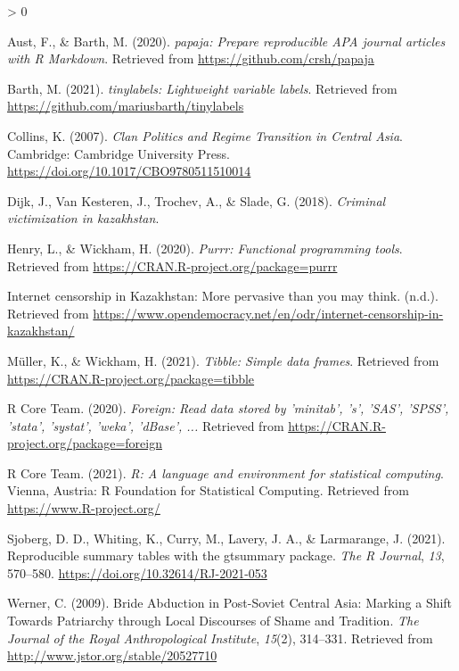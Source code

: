 \documentclass[
  english,
  man]{apa6}
\newlength{\cslhangindent}
\newenvironment{CSLReferences}[2] %
 {%
  \setlength{\parindent}{0pt}
  \ifodd #1 \everypar{\setlength{\hangindent}{\cslhangindent}}\ignorespaces\fi
  \ifnum #2 > 0
  \setlength{\parskip}{#2\baselineskip}
  \fi
 }%
 {}
\begin{document}
\hypertarget{refs}{}
\begin{CSLReferences}{1}{0}
\leavevmode\hypertarget{ref-R-papaja}{}%
Aust, F., \& Barth, M. (2020). \emph{{papaja}: {Prepare} reproducible {APA} journal articles with {R Markdown}}. Retrieved from \url{https://github.com/crsh/papaja}

\leavevmode\hypertarget{ref-R-tinylabels}{}%
Barth, M. (2021). \emph{{tinylabels}: Lightweight variable labels}. Retrieved from \url{https://github.com/mariusbarth/tinylabels}

\leavevmode\hypertarget{ref-collins2007}{}%
Collins, K. (2007). \emph{Clan {Politics} and {Regime} {Transition} in {Central} {Asia}}. Cambridge: Cambridge University Press. \url{https://doi.org/10.1017/CBO9780511510014}

\leavevmode\hypertarget{ref-ICVS}{}%
Dijk, J., Van Kesteren, J., Trochev, A., \& Slade, G. (2018). \emph{Criminal victimization in kazakhstan}.

\leavevmode\hypertarget{ref-R-purrr}{}%
Henry, L., \& Wickham, H. (2020). \emph{Purrr: Functional programming tools}. Retrieved from \url{https://CRAN.R-project.org/package=purrr}

\leavevmode\hypertarget{ref-zotero-120}{}%
Internet censorship in {Kazakhstan}: More pervasive than you may think. (n.d.). Retrieved from \url{https://www.opendemocracy.net/en/odr/internet-censorship-in-kazakhstan/}

\leavevmode\hypertarget{ref-R-tibble}{}%
Müller, K., \& Wickham, H. (2021). \emph{Tibble: Simple data frames}. Retrieved from \url{https://CRAN.R-project.org/package=tibble}

\leavevmode\hypertarget{ref-R-foreign}{}%
R Core Team. (2020). \emph{Foreign: Read data stored by 'minitab', 's', 'SAS', 'SPSS', 'stata', 'systat', 'weka', 'dBase', ...} Retrieved from \url{https://CRAN.R-project.org/package=foreign}

\leavevmode\hypertarget{ref-R-base}{}%
R Core Team. (2021). \emph{R: A language and environment for statistical computing}. Vienna, Austria: R Foundation for Statistical Computing. Retrieved from \url{https://www.R-project.org/}

\leavevmode\hypertarget{ref-R-gtsummary}{}%
Sjoberg, D. D., Whiting, K., Curry, M., Lavery, J. A., \& Larmarange, J. (2021). Reproducible summary tables with the gtsummary package. \emph{{The R Journal}}, \emph{13}, 570--580. \url{https://doi.org/10.32614/RJ-2021-053}

\leavevmode\hypertarget{ref-werner2009}{}%
Werner, C. (2009). Bride {Abduction} in {Post}-{Soviet} {Central} {Asia}: {Marking} a {Shift} {Towards} {Patriarchy} through {Local} {Discourses} of {Shame} and {Tradition}. \emph{The Journal of the Royal Anthropological Institute}, \emph{15}(2), 314--331. Retrieved from \url{http://www.jstor.org/stable/20527710}


\end{CSLReferences}
\end{document}
